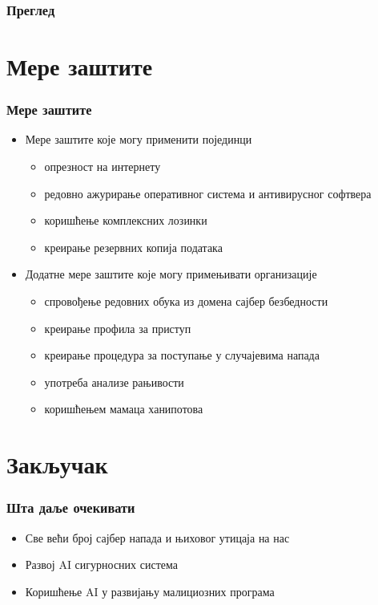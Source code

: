\documentclass{beamer}
\begin{document}
	
\begin{frame}
	\frametitle{Преглед}
	\tableofcontents
\end{frame}

\section{Мере заштите}

\begin{frame}[fragile]\frametitle{Мере заштите}
	\begin{itemize}	
	\item Мере заштите које могу применити појединци
		\begin{itemize}
		\item опрезност на интернету
		\item редовно ажурирање оперативног система и антивирусног софтвера
		\item коришћење комплексних лозинки
		\item креирање резервних копија података
	\end{itemize}
	\item Додатне мере заштите које могу примењивати организације
	\begin{itemize}
		\item спровођење редовних обука из домена сајбер безбедности 
		\item креирање профила за приступ
		\item креирање процедура за поступање у случајевима напада
		\item употреба анализе рањивости
		\item коришћењем мамаца ханипотова
	\end{itemize}
	\end{itemize}
\end{frame}
\section{Закључак}
	\begin{frame}\frametitle{Шта даље очекивати}
		\begin{itemize}
			\item Све већи број сајбер напада и њиховог утицаја на нас
			\item Развој AI сигурносних система
			\item Коришћење AI у развијању малициозних програма
		\end{itemize}
	\end{frame}
\end{document}
